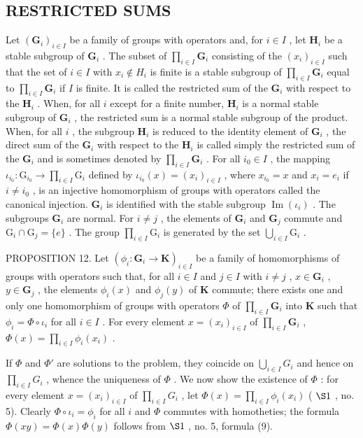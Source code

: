 \subsection{RESTRICTED SUMS}

Let \((\mathbf{G}_i)_{i\in I}\) be a family of groups with operators and, for \(i\in I\) , let \(\mathbf{H}_i\) be a stable subgroup of \(\mathbf{G}_i\) . The subset of \(\prod_{i\in I}\mathbf{G}_i\) consisting of the \((x_i)_{i\in I}\) such that the set of \(i\in I\) with \(x_i\notin H_i\) is finite is a stable subgroup of \(\prod_{i\in I}\mathbf{G}_i\) equal to \(\prod_{i\in I}\mathbf{G}_i\) if \(I\) is finite. It is called the restricted sum of the \(\mathbf{G}_i\) with respect to the \(\mathbf{H}_i\) . When, for all \(i\) except for a finite number, \(\mathbf{H}_i\) is a normal stable subgroup of \(\mathbf{G}_i\) , the restricted sum is a normal stable subgroup of the product. When, for all \(i\) , the subgroup \(\mathbf{H}_i\) is reduced to the identity element of \(\mathbf{G}_i\) , the direct sum of the \(\mathbf{G}_i\) with respect to the \(\mathbf{H}_i\) is called simply the restricted sum of the \(\mathbf{G}_i\) and is sometimes denoted by \(\prod_{i\in I}\mathbf{G}_i\) . For all \(i_0\in I\) , the mapping \(\iota_{i_0}:\mathrm{G}_{i_0}\to \prod_{i\in I}\mathrm{G}_i\) defined by \(\iota_{i_0}(x) = (x_i)_{i\in I}\) , where \(x_{i_0} = x\) and \(x_i = e_i\) if \(i\neq i_0\) , is an injective homomorphism of groups with operators called the canonical injection. \(\mathbf{G}_i\) is identified with the stable subgroup \(\operatorname {Im}(\iota_i)\) . The subgroups \(\mathbf{G}_i\) are normal. For \(i\neq j\) , the elements of \(\mathbf{G}_i\) and \(\mathbf{G}_j\) commute and \(\mathrm{G}_i\cap \mathrm{G}_j = \{e\}\) . The group \(\prod_{i\in I}\mathrm{G}_i\) is generated by the set \(\bigcup_{i\in I}\mathrm{G}_i\) .

PROPOSITION 12. Let \((\phi_i: \mathbf{G}_i \to \mathbf{K})_{i \in I}\) be a family of homomorphisms of groups with operators such that, for all \(i \in I\) and \(j \in I\) with \(i \neq j\) , \(x \in \mathbf{G}_i\) , \(y \in \mathbf{G}_j\) , the elements \(\phi_i(x)\) and \(\phi_j(y)\) of \(\mathbf{K}\) commute; there exists one and only one homomorphism of groups with operators \(\Phi\) of \(\prod_{i \in I} \mathbf{G}_i\) into \(\mathbf{K}\) such that \(\phi_i = \Phi \circ \iota_i\) for all \(i \in I\) . For every element \(x = (x_i)_{i \in I}\) of \(\prod_{i \in I} \mathbf{G}_i\) , \(\Phi(x) = \prod_{i \in I} \phi_i(x_i)\) .

If \(\Phi\) and \(\Phi'\) are solutions to the problem, they coincide on \(\bigcup_{i\in I}G_i\) and hence on \(\prod_{i\in I}G_i\) , whence the uniqueness of \(\Phi\) . We now show the existence of \(\Phi\) : for every element \(x = (x_i)_{i\in I}\) of \(\prod_{i\in I}G_i\) , let \(\Phi(x) = \prod_{i\in I}\phi_i(x_i)\) ( \(\S 1\) , no. 5). Clearly \(\Phi \circ \iota_i = \phi_i\) for all \(i\) and \(\Phi\) commutes with homotheties; the formula \(\Phi(xy) = \Phi(x)\Phi(y)\) follows from \(\S 1\) , no. 5, formula (9).

